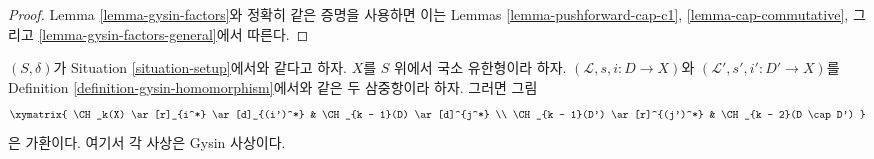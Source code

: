 \begin{proof}
Lemma \ref{lemma-gysin-factors}와 정확히 같은 증명을 사용하면 이는
Lemmas \ref{lemma-pushforward-cap-c1},
\ref{lemma-cap-commutative}, 그리고
\ref{lemma-gysin-factors-general}에서 따른다.
\end{proof}

\begin{lemma}
\label{lemma-gysin-commutes-gysin}
$(S, \delta)$가 Situation \ref{situation-setup}에서와 같다고 하자. $X$를
$S$ 위에서 국소 유한형이라 하자. $(\mathcal{L}, s, i : D \to X)$와
$(\mathcal{L}', s', i' : D' \to X)$를 Definition
\ref{definition-gysin-homomorphism}에서와 같은 두 삼중항이라 하자.
그러면 그림
$$
\xymatrix{
\CH_k(X) \ar[r]_{i^*} \ar[d]_{(i')^*} & \CH_{k - 1}(D) \ar[d]^{j^*} \\
\CH_{k - 1}(D') \ar[r]^{(j')^*} & \CH_{k - 2}(D \cap D')
}
$$
은 가환이다. 여기서 각 사상은 Gysin 사상이다.
\end{lemma}

